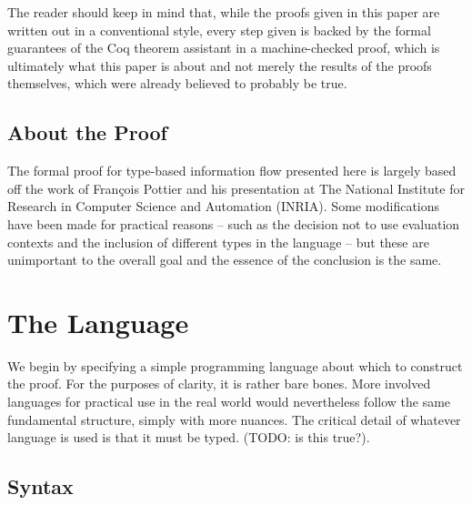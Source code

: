 \documentclass[12pt]{report}
\begin{document}
The reader should keep in mind that, while the proofs given in this
paper are written out in a conventional style, every step given is
backed by the formal guarantees of the Coq theorem assistant in
a machine-checked proof, which is ultimately what this paper is about
and not merely the results of the proofs themselves, which were
already believed to probably be true. 


\subsection{About the Proof}



 The formal proof for type-based information flow presented here
is largely based off the work of François Pottier and his
presentation at The National Institute for Research in Computer
Science and Automation (INRIA).  Some modifications have been made for
practical reasons – such as the decision not to use evaluation
contexts and the inclusion of different types in the language – but
these are unimportant to the overall goal and the essence of the
conclusion is the same. 

\section{The Language}



 We begin by specifying a simple programming language about which
to construct the proof. For the purposes of clarity, it is rather
bare bones. More involved languages for practical use in the real
world would nevertheless follow the same fundamental structure,
simply with more nuances. The critical detail of whatever language is
used is that it must be typed. (TODO: is this true?).  \begin{coqdoccode}
\coqdocemptyline
\coqdocemptyline
\end{coqdoccode}
\subsection{Syntax}
\end{document}
